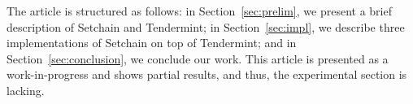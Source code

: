 The article is structured as follows: in Section~\ref{sec:prelim}, we present a
brief description of Setchain and Tendermint; in Section~\ref{sec:impl}, we
describe three implementations of Setchain on top of Tendermint; and in
Section~\ref{sec:conclusion}, we conclude our work.
%
This article is presented as a work-in-progress and shows partial results, and
thus, the experimental section is lacking.


